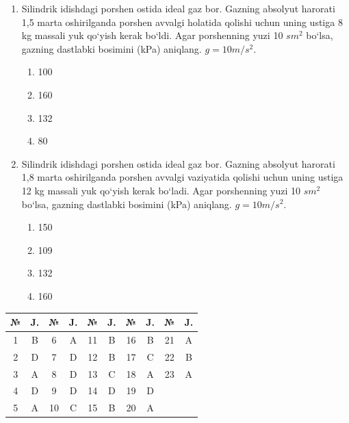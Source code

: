 \begin{enumerate}
\item Silindrik idishdagi porshen ostida ideal gaz bor. Gazning absolyut harorati 1,5 marta oshirilganda porshen avvalgi holatida qolishi uchun uning ustiga 8 kg massali yuk qo‘yish kerak bo‘ldi. Agar porshenning yuzi 10 $sm^2$ bo‘lsa, gazning dastlabki bosimini (kPa) aniqlang. $g=10 m/s^2$.
\begin{enumerate}[label=\Alph*)]
\item 100
\item 160
\item 132
\item 80
\end{enumerate}

\item Silindrik idishdagi porshen ostida ideal gaz bor. Gazning absolyut harorati 1,8 marta oshirilganda porshen avvalgi vaziyatida qolishi uchun uning ustiga 12 kg massali yuk qo‘yish kerak bo‘ladi. Agar porshenning yuzi 10 $sm^2$ bo‘lsa, gazning dastlabki bosimini (kPa) aniqlang. $g=10 m/s^2$.
\begin{enumerate}[label=\Alph*)]
\item 150
\item 109
\item 132
\item 160
\end{enumerate}

\end{enumerate}



\begin{table}[h!]
\centering
\begin{tabular}{|c|c|c|c|c|c|c|c|c|c|}
\hline
№ & J. & № & J. & № & J. & № & J. & № & J. \\ \hline
1 & B & 6 & A & 11 & B & 16 & B & 21 & A \\ \hline
2 & D & 7 & D & 12 & B & 17 & C & 22 & B \\ \hline
3 & A & 8 & D & 13 & C & 18 & A & 23 & A \\ \hline
4 & D & 9 & D & 14 & D & 19 & D & & \\ \hline
5 & A & 10 & C & 15 & B & 20 & A & & \\ \hline
\end{tabular}
\end{table}